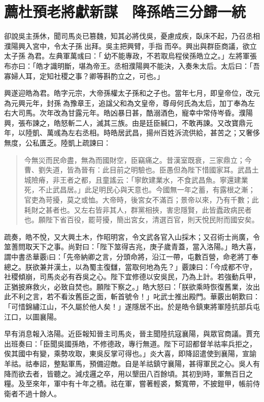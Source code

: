 
\chapter{薦杜預老將獻新謀　降孫皓三分歸一統}

卻說吳主孫休，聞司馬炎已篡魏，知其必將伐吳，憂慮成疾，臥床不起，乃召丞相濮陽興入宮中，令太子孫𩅦出拜。吳主把興臂，手指𩅦而卒。興出與群臣商議，欲立太子孫𩅦為君。左典軍萬彧曰：「𩅦幼不能專政，不若取烏程侯孫皓立之。」左將軍張布亦曰：「皓才識明斷，堪為帝王。丞相濮陽興不能決，入奏朱太后。太后曰：「吾寡婦人耳，定知社稷之事？卿等斟酌立之，可也。」

興遂迎皓為君。皓字元宗，大帝孫權太子孫和之子也。當年七月，即皇帝位，改元為元興元年，封孫𩅦為豫章王，追諡父和為文皇帝，尊母何氏為太后，加丁奉為左右大司馬。次年改為甘露元年。皓凶暴日甚，酷溺酒色，寵幸中常侍岑昏。濮陽興，張布諫之，皓怒斬二人，滅其三族。由是廷臣緘口，不敢再諫。又改寶鼎元年，以陸凱、萬彧為左右丞相。時皓居武昌，揚州百姓泝流供給，甚苦之；又奢侈無度，公私匱乏。陸凱上疏諫曰：

\begin{quote}
今無災而民命盡，無為而國財空，臣竊痛之。昔漢室既衰，三家鼎立；今曹、劉失道，皆為晉有：此目前之明驗也。臣愚但為陛下惜國家耳。武昌土城險瘠，非王者之都，且童謠云：「寧飲建業水，不食武昌魚。寧還建業死，不止武昌居。」此足明民心與天意也。今國無一年之蓄，有露根之漸；官吏為苛擾，莫之或恤。大帝時，後宮女不滿百；景帝以來，乃有千數；此耗財之甚者也。又左右皆非其人，群黨相挾，害忠隱賢，此皆蠹政病民者也。願陛下省百役，罷苛擾，簡出宮女，清選百官，則天悅民附而國安矣。
\end{quote}

疏奏，皓不悅，又大興土木，作昭明宮，令文武各官入山採木；又召術士尚廣，令筮蓍問取天下之事。尚對曰：「陛下筮得吉兆，庚子歲青蓋，當入洛陽。」皓大喜，謂中書丞華覈i曰：「先帝納卿之言，分頭命將，沿江一帶，屯數百營，命老將丁奉總之。朕欲兼并漢土，以為蜀主復讎，當取何地為先？」覈諫曰：「今成都不守，社稷傾崩，司馬炎必有吞吳之心。陛下宜修德以安吳民，乃為上計。若強動兵甲，正猶披麻救火，必致自焚也。願陛下察之。」皓大怒曰：「朕欲乘時恢復舊業，汝出此不利之言，若不看汝舊臣之面，斬首號令！」叱武士推出殿門。華覈出朝歎曰：「可惜錦繡江山，不久屬於他人矣！」遂隱居不出。於是皓令鎮東將軍陸抗部兵屯江口，以圖襄陽。

早有消息報入洛陽。近臣報知晉主司馬炎，晉主聞陸抗寇襄陽，與眾官商議。賈充出班奏曰：「臣聞吳國孫皓，不修德政，專行無道。陛下可詔都督羊祜率兵拒之，俟其國中有變，乘勢攻取，東吳反掌可得也。」炎大喜，即降詔遣使到襄陽，宣諭羊祜。祜奉詔，整點軍馬，預備迎敵。自是羊祜鎮守襄陽，甚得軍民之心。吳人有降而欲去者，皆聽之。減戍邏之卒，用以墾田八百餘頃。其初到時，軍無百日之糧。及至來年，軍中有十年之積。祜在軍，嘗著輕裘，繫寬帶，不披鎧甲，帳前侍衛者不過十餘人。

